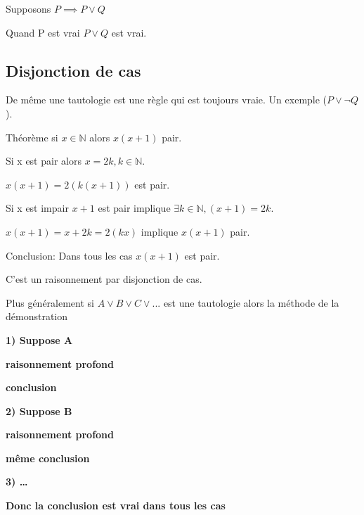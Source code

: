 \documentclass[a4paper, 12pt]{article}
\begin{document}
\begin{example}
    Supposons $P \implies P \lor Q$

    Quand P est vrai $P \lor Q$ est vrai.
\end{example}

\subsection{Disjonction de cas}

De même une tautologie est une règle qui est toujours vraie. Un exemple ($P \lor \neg Q$).

\begin{example}
    Théorème si $x \in \mathbb{N}$ alors $x(x + 1)$ pair.

    \vspace{1em}

    Si x est pair alors $x = 2k, k \in \mathbb{N}$.

    $x(x + 1) = 2(k(x + 1))$ est pair.

    \vspace{1em}

    Si x est impair $x + 1$ est pair implique $\exists k \in \mathbb{N}, (x + 1) = 2k$.

    $x(x + 1) = x + 2k = 2(kx)$ implique $x(x + 1)$ pair.

    \vspace{1em}

    Conclusion: Dans tous les cas $x(x + 1)$ est pair.
    
    C'est un raisonnement par disjonction de cas.
\end{example}

\begin{methode}
    Plus généralement si $A \lor B \lor C \lor ...$ est une tautologie alors la méthode de la démonstration

    \vspace{0.5em}

    \item \textbf{1) Suppose A}
    \item \textbf{raisonnement profond}
    \item \textbf{conclusion}
    \item \textbf{2) Suppose B}
    \item \textbf{raisonnement profond}
    \item \textbf{même conclusion}
    \item \textbf{3) \ldots}
    \item \textbf{Donc la conclusion est vrai dans tous les cas}
\end{methode}
\end{document}
